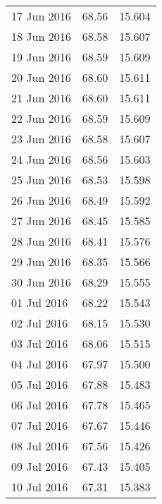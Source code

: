 \documentclass[11pt,a4paper,twoside]{article}
\begin{document}
\begin{longtable}{lcc}
17 Jun 2016                    & 68.56                & 15.604     \\
18 Jun 2016                    & 68.58                & 15.607     \\
19 Jun 2016                    & 68.59                & 15.609     \\
20 Jun 2016                    & 68.60                & 15.611     \\
21 Jun 2016                    & 68.60                & 15.611     \\
22 Jun 2016                    & 68.59                & 15.609     \\
23 Jun 2016                    & 68.58                & 15.607     \\
24 Jun 2016                    & 68.56                & 15.603     \\
25 Jun 2016                    & 68.53                & 15.598     \\
26 Jun 2016                    & 68.49                & 15.592     \\
27 Jun 2016                    & 68.45                & 15.585     \\
28 Jun 2016                    & 68.41                & 15.576     \\
29 Jun 2016                    & 68.35                & 15.566     \\
30 Jun 2016                    & 68.29                & 15.555     \\
01 Jul 2016                    & 68.22                & 15.543     \\
02 Jul 2016                    & 68.15                & 15.530     \\
03 Jul 2016                    & 68.06                & 15.515     \\
04 Jul 2016                    & 67.97                & 15.500     \\
05 Jul 2016                    & 67.88                & 15.483     \\
06 Jul 2016                    & 67.78                & 15.465     \\
07 Jul 2016                    & 67.67                & 15.446     \\
08 Jul 2016                    & 67.56                & 15.426     \\
09 Jul 2016                    & 67.43                & 15.405     \\
10 Jul 2016                    & 67.31                & 15.383     \\

\end{longtable}
\end{document}
